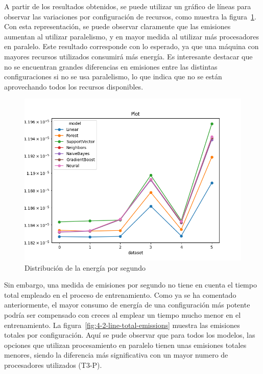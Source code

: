 A partir de los resultados obtenidos, se puede utilizar un gráfico de líneas para observar las variaciones por configuración de recursos, como muestra la figura~\ref{fig:4-2-line-energy-per-second}. Con esta representación, se puede observar claramente que las emisiones aumentan al utilizar paralelismo, y en mayor medida al utilizar más procesadores en paralelo. Este resultado corresponde con lo esperado, ya que una máquina con mayores recursos utilizados consumirá más energía. Es interesante destacar que no se encuentran grandes diferencias en emisiones entre las distintas configuraciones si no se usa paralelismo, lo que indica que no se están aprovechando todos los recursos disponibles.

\begin{figure}[H]
  \centerline{
     \includegraphics[width=\textwidth, keepaspectratio]{img/graph/2-line-energy-p-s.png}
  }
  \caption{Distribución de la energía por segundo}
  \label{fig:4-2-line-energy-per-second}
\end{figure}

Sin embargo, una medida de emisiones por segundo no tiene en cuenta el tiempo total empleado en el proceso de entrenamiento. Como ya se ha comentado anteriormente, el mayor consumo de energía de una configuración más potente podría ser compensado con creces al emplear un tiempo mucho menor en el entrenamiento. La figura~\ref{fig:4-2-line-total-emissions} muestra las emisiones totales por configuración. Aquí se pude observar que para todos los modelos, las opciones que utilizan procesamiento en paralelo tienen unas emisiones totales menores, siendo la diferencia más significativa con un mayor numero de procesadores utilizados (T3-P).

